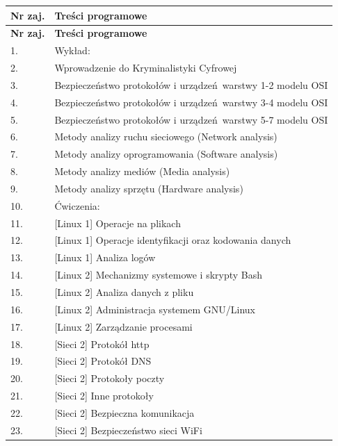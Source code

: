 \documentclass[12pt, a4paper]{article}
\newcommand{\thdrule}{\noalign{\global\setlength{\extrarowheight}{0pt}}}
\newcommand{\thdend}{\noalign{\global\setlength{\extrarowheight}{3pt}}}
\begin{document}
{\scriptsize
\begin{longtable}{m{1.5cm}m{14.5cm}}
\thdrule\toprule
\rowcolor{pjatkRed} {\color{white}\textbf{Nr zaj.}} & {\color{white}\textbf{Treści programowe}} \\
\midrule\thdend
\endfirsthead
\thdrule\toprule
\rowcolor{pjatkRed} {\color{white}\textbf{Nr zaj.}} & {\color{white}\textbf{Treści programowe}} \\
\midrule\thdend
\endhead
  \rowcolor{tableRowLight} 1. & Wykład: \\
  \rowcolor{tableRowAlt} 2. & Wprowadzenie do Kryminalistyki Cyfrowej \\
  \rowcolor{tableRowLight} 3. & Bezpieczeństwo protokołów i urządzeń warstwy 1-2 modelu OSI \\
  \rowcolor{tableRowAlt} 4. & Bezpieczeństwo protokołów i urządzeń warstwy 3-4 modelu OSI \\
  \rowcolor{tableRowLight} 5. & Bezpieczeństwo protokołów i urządzeń warstwy 5-7 modelu OSI \\
  \rowcolor{tableRowAlt} 6. & Metody analizy ruchu sieciowego (Network analysis) \\
  \rowcolor{tableRowLight} 7. & Metody analizy oprogramowania (Software analysis) \\
  \rowcolor{tableRowAlt} 8. & Metody analizy mediów (Media analysis) \\
  \rowcolor{tableRowLight} 9. & Metody analizy sprzętu (Hardware analysis) \\
  \rowcolor{tableRowAlt} 10. & Ćwiczenia: \\
  \rowcolor{tableRowLight} 11. & {[}Linux 1{]} Operacje na plikach \\
  \rowcolor{tableRowAlt} 12. & {[}Linux 1{]} Operacje identyfikacji oraz kodowania danych \\
  \rowcolor{tableRowLight} 13. & {[}Linux 1{]} Analiza logów \\
  \rowcolor{tableRowAlt} 14. & {[}Linux 2{]} Mechanizmy systemowe i skrypty Bash \\
  \rowcolor{tableRowLight} 15. & {[}Linux 2{]} Analiza danych z pliku \\
  \rowcolor{tableRowAlt} 16. & {[}Linux 2{]} Administracja systemem GNU/Linux \\
  \rowcolor{tableRowLight} 17. & {[}Linux 2{]} Zarządzanie procesami \\
  \rowcolor{tableRowAlt} 18. & {[}Sieci 2{]} Protokół http \\
  \rowcolor{tableRowLight} 19. & {[}Sieci 2{]} Protokół DNS \\
  \rowcolor{tableRowAlt} 20. & {[}Sieci 2{]} Protokoły poczty \\
  \rowcolor{tableRowLight} 21. & {[}Sieci 2{]} Inne protokoły \\
  \rowcolor{tableRowAlt} 22. & {[}Sieci 2{]} Bezpieczna komunikacja \\
  \rowcolor{tableRowLight} 23. & {[}Sieci 2{]} Bezpieczeństwo sieci WiFi \\
\bottomrule
\end{longtable}}
\end{document}
